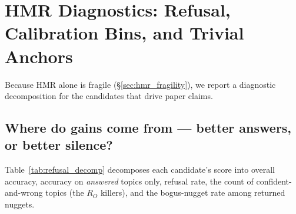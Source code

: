 \documentclass[11pt,a4paper]{article}
\begin{document}
\section{HMR Diagnostics: Refusal, Calibration Bins, and Trivial Anchors}\label{sec:hmr_diagnostics}

Because HMR alone is fragile (\S\ref{sec:hmr_fragility}), we report a
diagnostic decomposition for the candidates that drive paper claims.

\subsection{Where do gains come from — better answers, or better silence?}

Table~\ref{tab:refusal_decomp} decomposes each candidate's score into
overall accuracy, accuracy on \emph{answered} topics only, refusal
rate, the count of confident-and-wrong topics (the $R_O$
killers), and the bogus-nugget rate among returned nuggets.
\end{document}
